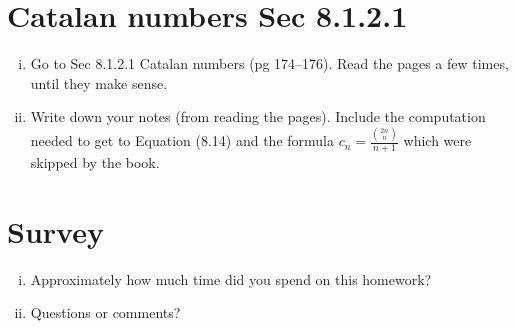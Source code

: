 \documentclass[10pt]{amsart}
\begin{document}
\section{Catalan numbers Sec 8.1.2.1}

\begin{enumerate}[i.]
\item Go to Sec 8.1.2.1
Catalan numbers (pg 174--176). Read the pages a few times, until they make sense.

\item 
Write down your notes (from reading the pages). Include the computation needed to get to Equation (8.14) and the formula $c_n=\frac{\binom{2n}{n}}{n+1}$ which were skipped by the book.

\end{enumerate}





\section{Survey}
\begin{enumerate}[i.] 
\item Approximately how much time did you spend on this homework?
\item Questions or comments?
\end{enumerate}
\end{document}
